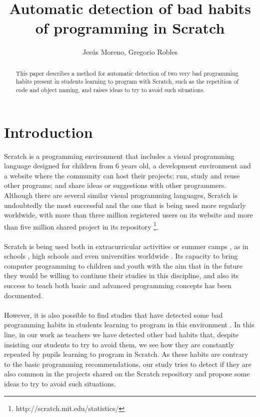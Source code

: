 \documentclass[a4paper,10pt]{article}
\title{Automatic detection of bad habits of programming in Scratch}
\author{Jesús Moreno, Gregorio Robles}
\begin{document}
\maketitle

\begin{abstract}
This paper describes a method for automatic detection of two very bad programming habits present in students learning to program with Scratch, such as the repetition of code and object naming, and raises ideas to try to avoid such situations.

\end{abstract}

\section{Introduction}
Scratch \cite{resnick2009scratch}  is a programming environment that includes a visual programming language designed for children from 6 years old, a development environment and a website where the community can host their projects; run, study and reuse other programs; and share ideas or suggestions with other programmers. Although there are several similar visual programming languages​​, Scratch is undoubtedly the most successful and the one that is being used more regularly worldwide, with more than three million registered users on its website and more than five million shared project in its repository \footnote{http://scratch.mit.edu/statistics/}.
\paragraph{}Scratch is being used both in extracurricular activities \cite{maloney2008programming, kafai2010entering} or summer camps \cite{adams2010scratching, franklin2013assessment}, as in schools \cite{wilson2012evaluation}, high schools \cite{meerbaum2013learning} and even universities worldwide \cite{wolz2009starting, malan2007scratch}. Its capacity to bring computer programming to children and youth with the aim that in the future they would be willing to continue their studies in this discipline, and also its success to teach both basic and advanced programming concepts has been documented.
\paragraph{}However, it is also possible to find studies that have detected some bad programming habits in students learning to program in this environment \cite{meerbaum2011habits}. In this line, in our work as teachers we have detected other bad habits that, despite insisting our students to try to avoid them, we see how they are constantly repeated by pupils learning to program in Scratch. As these habits are contrary to the basic programming recommendations, our study tries to detect if they are also common in the projects shared on the Scratch repository and propose some ideas to try to avoid such situations.
\end{document}
